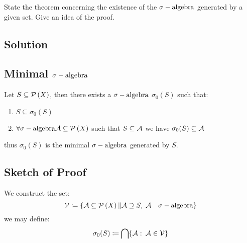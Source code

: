

\question
State the theorem concerning the existence of the $\sigma-\text{algebra}$ generated by a given set. Give an
idea of the proof.

\subsection*{Solution}

\subsection{Minimal \texorpdfstring{$\sigma-\text{algebra}$}{sigma-algebra}}
Let $S\subseteq\mathcal{P}\left(X\right)$, then there exists a $\sigma-\text{algebra}$ $\sigma_0(S)$ such that:\\
\begin{enumerate}
    \item $S\subseteq \sigma_0(S)$
    \item $\forall \sigma-\text{algebra} \mathcal{A}\subseteq\mathcal{P}\left(X\right)$ such that $S\subseteq\mathcal{A}$ we have $\sigma_0(S) \subseteq\mathcal{A}$
\end{enumerate}
thus $\sigma_0(S)$ is the minimal $\sigma-\text{algebra}$ generated by $S$.\\

\subsection*{Sketch of Proof}
We construct the set:
\[
    \mathcal{V} \coloneqq \{\mathcal{A} \subseteq \mathcal{P}\left(X\right) \| \mathcal{A} \supseteq S, \; \mathcal{A} \quad \sigma-\text{algebra} \}    
\]
we may define:
\[
    \sigma_0(S)\coloneqq \bigcap \{\mathcal{A}: \: \mathcal{A}\in\mathcal{V}\}    
\]